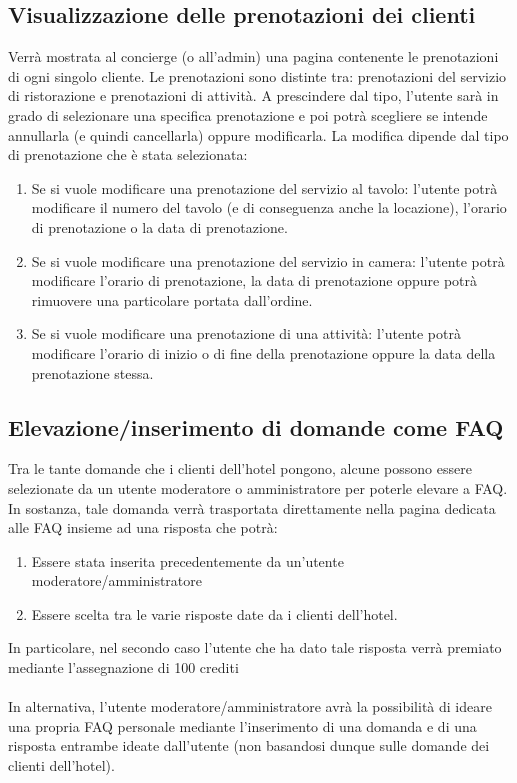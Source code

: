 \documentclass [a4paper, 12pt]{book}
\begin{document}
\subsection{Visualizzazione delle prenotazioni dei clienti}
\label{VisualizzaPrenotazioniClienti}
Verrà mostrata al concierge (o all'admin) una pagina contenente le prenotazioni di ogni singolo cliente. Le prenotazioni sono distinte tra: prenotazioni del servizio di ristorazione e prenotazioni di attività. A prescindere dal tipo, l'utente sarà in grado di selezionare una specifica prenotazione e poi potrà scegliere se intende annullarla (e quindi cancellarla) oppure modificarla. La modifica dipende dal tipo di prenotazione che è stata selezionata:
\begin{enumerate}
\item Se si vuole modificare una prenotazione del servizio al tavolo: l'utente potrà modificare il numero del tavolo (e di conseguenza anche la locazione), l'orario di prenotazione o la data di prenotazione.
\item Se si vuole modificare una prenotazione del servizio in camera: l'utente potrà modificare l'orario di prenotazione, la data di prenotazione oppure potrà rimuovere una particolare portata dall'ordine.
\item Se si vuole modificare una prenotazione di una attività: l'utente potrà modificare l'orario di inizio o di fine della prenotazione oppure la data della prenotazione stessa.
\end{enumerate}

\medskip

\subsection{Elevazione/inserimento di domande come FAQ}
Tra le tante domande che i clienti dell'hotel pongono, alcune possono essere selezionate da un utente moderatore o amministratore per poterle elevare a FAQ. In sostanza, tale domanda verrà trasportata direttamente nella pagina dedicata alle FAQ insieme ad una risposta che potrà:
\begin{enumerate}
\item Essere stata inserita precedentemente da un'utente moderatore/amministratore
\item Essere scelta tra le varie risposte date da i clienti dell'hotel.
\end{enumerate}
In particolare, nel secondo caso l'utente che ha dato tale risposta verrà premiato mediante l'assegnazione di 100 crediti\\\\
In alternativa, l'utente moderatore/amministratore avrà la possibilità di ideare una propria FAQ personale mediante l'inserimento di una domanda e di una risposta entrambe ideate dall'utente (non basandosi dunque sulle domande dei clienti dell'hotel).
\end{document}
